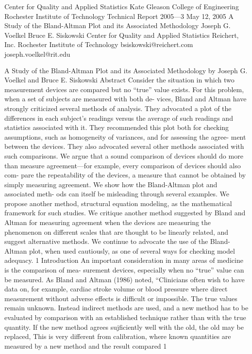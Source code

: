 Center for Quality and Applied Statistics
Kate Gleason College of Engineering
Rochester Institute of Technology
Technical Report 2005—3
May 12, 2005
A Study of the Bland-Altman Plot
and its Associated Methodology
Joseph G. Voelkel Bruce E. Siskowski
Center for Quality and Applied Statistics Reichert, Inc.
Rochester Institute of Technology bsiskowski@reichert.com
joseph.voelkel@rit.edu






A Study of the Bland-Altman Plot and its Associated Methodology
by
Joseph G. Voelkel and Bruce E. Siskowski
Abstract
Consider the situation in which two measurement devices are compared but no “true”
value exists. For this problem, when a set of subjects are measured with both de-
vices, Bland and Altman have strongly criticized several methods of analysis. They
advocated a plot of the differences in each subject’s readings versus the average of
such readings and statistics associated with it. They recommended this plot both for
checking assumptions, such as homogeneity of variances, and for assessing the agree-
ment between the devices. They also advocated several other methods associated
with such comparisons. We argue that a sound comparison of devices should do more
than measure agreement—for example, every comparison of devices should also com-
pare the repeatability of the devices, a measure that cannot be obtained by simply
measuring agreement. We show how the Bland-Altman plot and associated meth-
ods can itself be misleading through several examples. We propose another method,
structural equation modeling, as the mathematical framework for such studies. We
critique another method suggested by Bland and Altman for measuring agreement
when the devices are measuring the phenomenon on different scales that are thought
to be linearly related, and suggest alternative methods. We continue to advocate
the use of the Bland-Altman plot, when used cautiously, as one of several ways for
checking model adequacy.
1 Introduction
An important consideration in many areas of medicine is the comparison of mea-
surement devices, especially when no “true” value can be measured. As Bland and
Altman (1986) noted, “Clinicians often wish to have data on, for example, cardiac
stroke volume or blood pressure where direct measurement without adverse effects is
difficult or impossible. The true values remain unknown. Instead indirect methods
are used, and a new method has to be evaluated by comparison with an established
technique rather than with the true quantity. If the new method agrees sujﬁciently
well with the old, the old may be replaced, This is very different from calibration,
where known quantities are measured by a new method and the result compared
1



